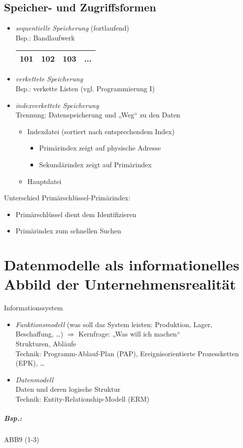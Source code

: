 \subsection{Speicher- und Zugriffsformen}
\begin{itemize}
\item \emph{sequentielle Speicherung} (fortlaufend)\\
Bsp.: Bandlaufwerk\\
\begin{tabular}{| c | c | c | c}
101 & 102 & 103 & ...\\
\hline
\end{tabular}
\item \emph{verkettete Speicherung}\\
Bsp.: verkette Listen (vgl. Programmierung I)
\item \emph{indexverkettete Speicherung}\\
Trennung: Datenspeicherung und „Weg“ zu den Daten
\begin{itemize}
\item Indexdatei (sortiert nach entsprechendem Index)
\begin{itemize}
\item Primärindex zeigt auf physische Adresse
\item Sekundärindex zeigt auf Primärindex
\end{itemize}
\item Hauptdatei
\end{itemize}
\end{itemize}
Unterschied Primärschlüssel-Primärindex:
\begin{itemize}
\item Primärschlüssel dient dem Identifizieren
\item Primärindex zum schnellen Suchen
\end{itemize}

\section[Datenmodelle als Abbild]{Datenmodelle als informationelles Abbild der Unternehmensrealität}
Informationssystem
\begin{itemize}
\item \emph{Funktionsmodell} (was soll das System leisten: Produktion, Lager, Beschaffung, …) $\Rightarrow$ Kernfrage: „Was will ich machen“\\
Strukturen, Abläufe\\
Technik: Programm-Ablauf-Plan (PAP), Ereignisorientierte Prozessketten (EPK), …
\item \emph{Datenmodell}\\
Daten und deren logische Struktur\\
Technik: Entity-Relationship-Modell (ERM)
\end{itemize}
\subparagraph{Bsp.:} \parskp
ABB9 (1-3)

